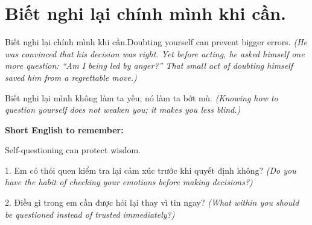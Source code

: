 \section{Biết nghi lại chính mình khi cần.}
\begin{truyen}{Biết nghi lại chính mình khi cần.}{Doubting yourself can prevent bigger errors.}
\textit{(He was convinced that his decision was right. Yet before acting, he asked himself one more question: “Am I being led by anger?” That small act of doubting himself saved him from a regrettable move.)}
\end{truyen}
\begin{baihoc}
Biết nghi lại mình không làm ta yếu; nó làm ta bớt mù.
\textit{(Knowing how to question yourself does not weaken you; it makes you less blind.)}
\end{baihoc}
\begin{ghinhoanh}
\textbf{Short English to remember:}

Self-questioning can protect wisdom.
\end{ghinhoanh}
\begin{tuhocnhanh}
1. Em có thói quen kiểm tra lại cảm xúc trước khi quyết định không? \textit{(Do you have the habit of checking your emotions before making decisions?)}

2. Điều gì trong em cần được hỏi lại thay vì tin ngay? \textit{(What within you should be questioned instead of trusted immediately?)}
\end{tuhocnhanh}
\ngancach

